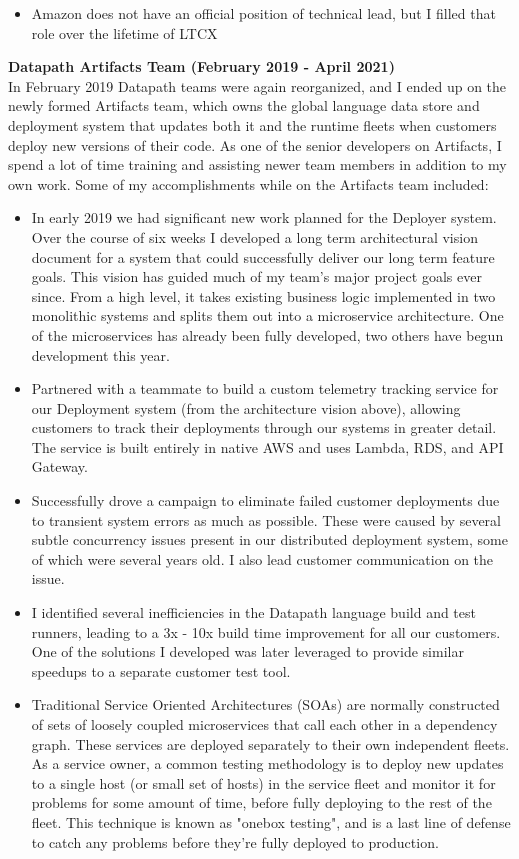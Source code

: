\documentclass{res}
\begin{document}
\begin{resume}
\begin{itemize}
   \item Amazon does not have an official position of technical lead, but I filled that role over the lifetime of LTCX
   \end{itemize}
   {\bf Datapath Artifacts Team (February 2019 - April 2021) }\\
   In February 2019 Datapath teams were again reorganized, and I ended up on the newly formed Artifacts team, which owns the global language data store and deployment system that updates both it and the runtime fleets when customers deploy new versions of their code.  As one of the senior developers on Artifacts, I spend a lot of time training and assisting newer team members in addition to my own work.  Some of my accomplishments while on the Artifacts team included:
   \begin{itemize}
   \item In early 2019 we had significant new work planned for the Deployer system.  Over the course of six weeks I developed a long term architectural vision document for a system that could successfully deliver our long term feature goals.  This vision has guided much of my team's major project goals ever since.  From a high level, it takes existing business logic implemented in two monolithic systems and splits them out into a microservice architecture.  One of the microservices has already been fully developed, two others have begun development this year.
   \item Partnered with a teammate to build a custom telemetry tracking service for our Deployment system (from the architecture vision above), allowing customers to track their deployments through our systems in greater detail.  The service is built entirely in native AWS and uses Lambda, RDS, and API Gateway.
   \item Successfully drove a campaign to eliminate failed customer deployments due to transient system errors as much as possible.  These were caused by several subtle concurrency issues present in our distributed deployment system, some of which were several years old.  I also lead customer communication on the issue.
   \item I identified several inefficiencies in the Datapath language build and test runners, leading to a 3x - 10x build time improvement for all our customers.  One of the solutions I developed was later leveraged to provide similar speedups to a separate customer test tool.
   \item Traditional Service Oriented Architectures (SOAs) are normally constructed of sets of loosely coupled microservices that call each other in a dependency graph.  These services are deployed separately to their own independent fleets.  As a service owner, a common testing methodology is to deploy new updates to a single host (or small set of hosts) in the service fleet and monitor it for problems for some amount of time, before fully deploying to the rest of the fleet.  This technique is known as "onebox testing", and is a last line of defense to catch any problems before they're fully deployed to production.\\

\end{itemize}
\end{resume}
\end{document}
